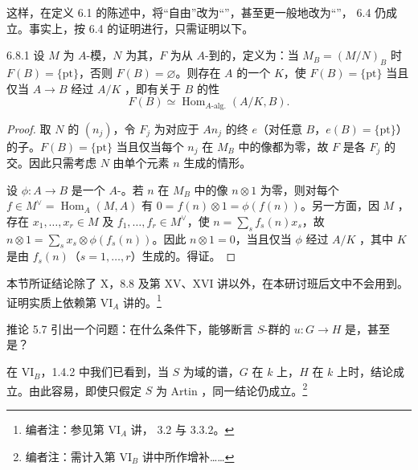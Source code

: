 这样，在定义 6.1 的陈述中，将“自由”改为“”，甚至更一般地改为“”， 6.4 仍成立。事实上，按 6.4 的证明进行，只需证明以下。
\begin{SGAresult}{}{6.8.1}
设 $M$ 为 $A$-模，$N$ 为其，$F$ 为从 $A$-到的，定义为：当 $M_B=(M/N)_B$ 时 $F(B)=\{\mathrm{pt}\}$，否则 $F(B)=\varnothing$。则存在 $A$ 的一个 $K$，使 $F(B)=\{\mathrm{pt}\}$ 当且仅当 $A\to B$ 经过 $A/K$ ，即有关于 $B$ 的性
\[
F(B)\simeq\operatorname{Hom}_{A\text{-}\mathrm{alg.}}(A/K,B).
\]
\end{SGAresult}
\begin{proof}
取 $N$ 的 $(n_j)$，令 $F_j$ 为对应于 $An_j$ 的终 $e$（对任意 $B$，$e(B)=\{\mathrm{pt}\}$）的子。$F(B)=\{\mathrm{pt}\}$ 当且仅当每个 $n_j$ 在 $M_B$ 中的像都为零，故 $F$ 是各 $F_j$ 的交。因此只需考虑 $N$ 由单个元素 $n$ 生成的情形。

设 $\phi:A\to B$ 是一个 $A$-。若 $n$ 在 $M_B$ 中的像 $n\otimes1$ 为零，则对每个 $f\in M^\vee=\operatorname{Hom}_A(M,A)$ 有 $0=f(n)\otimes1=\phi(f(n))$。另一方面，因 $M$ ，存在 $x_1,\ldots,x_r\in M$ 及 $f_1,\ldots,f_r\in M^\vee$，使 $n=\sum_sf_s(n)x_s$，故 $n\otimes1=\sum_sx_s\otimes\phi(f_s(n))$。因此 $n\otimes1=0$，当且仅当 $\phi$ 经过 $A/K$ ，其中 $K$ 是由 $f_s(n)$（$s=1,\ldots,r$）生成的。得证。
\end{proof}
本节所证结论除了 X，8.8 及第 XV、XVI 讲以外，在本研讨班后文中不会用到。证明实质上依赖第 VI$_A$ 讲的。\footnote[32]{编者注：参见第 VI$_A$ 讲， 3.2 与 3.3.2。}

推论 5.7 引出一个问题：在什么条件下，能够断言 $S$-群的 $u:G\to H$ 是，甚至是？

在 VI$_B$，1.4.2 中我们已看到，当 $S$ 为域的谱，$G$ 在 $k$ 上，$H$ 在 $k$ 上时，结论成立。由此容易，即使只假定 $S$ 为 Artin ，同一结论仍成立。\footnote[33]{编者注：需计入第 VI$_B$ 讲中所作增补……}


